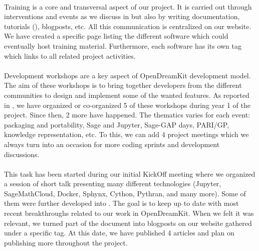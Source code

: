 \documentclass{deliverablereport}
\begin{document}
\paragraph{}

Training is a core and transversal aspect of our project. It is carried out 
through interventions and events as we discuss in  but also
by writing documentation, tutorials (), blogposts, etc. All
this communication is centralized on our website. We have created a specific 
page listing the different software which could eventually host training material. Furthermore,
each software has its own tag which links to all related project activities.

\paragraph{}
\label{dissem@devel-workshops}

Development workshops are a key aspect of OpenDreamKit development model. The aim of these workshops is to bring together developers from the different communities to design and implement some 
of the wanted features. As reported in , we have organized
or co-organized 5 of these workshops during year 1 of the project. Since then, 2 more have happened. The thematics varies
for each event: packaging and portability, Sage and Jupyter, Sage-GAP days, PARI/GP, knowledge representation, etc. To this,
we can add 4 project meetings which we always turn into an occasion for more coding sprints and development
discussions.

\paragraph{}

This task has been started during our initial KickOff meeting where we organized a session of short
talk presenting many different technologies (Jupyter, SageMathCloud, Docker, Sphynx, Cython, Pythran, and
many more). Some of them were further developed into . The goal is to
keep up to date with most recent breakthroughs related to our work in OpenDreamKit. When we felt
it was relevant, we turned part of the document into blogposts on our website gathered under a 
specific tag. At this date, we have published 4 articles and plan on publishing more throughout the
project.
\end{document}
